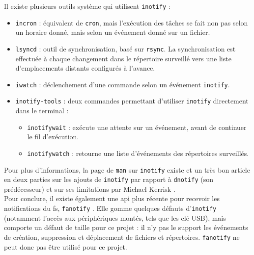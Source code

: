 Il existe plusieurs outils système qui utilisent \texttt{inotify} \cite{ref30} :
\begin{itemize}
    \item \texttt{incron} : équivalent de \texttt{cron}, mais l'exécution 
        des tâches se fait non pas selon un horaire donné, mais selon un événement donné sur un fichier.
    \item \texttt{lsyncd} : outil de synchronisation, basé sur \texttt{rsync}. 
        La synchronisation est effectuée à chaque changement dans le répertoire surveillé vers une 
        liste d'emplacements distants configurés à l'avance.
    \item \texttt{iwatch} : déclenchement d'une commande selon un événement \texttt{inotify}.
    \item \texttt{inotify-tools} : deux commandes permettant d'utiliser \texttt{inotify} 
        directement dans le terminal :
        \begin{itemize}
            \item \texttt{inotifywait} : exécute une attente sur un événement, avant de 
                continuer le fil d'exécution.
            \item \texttt{inotifywatch} : retourne une liste d'événements des répertoires surveillés.
        \end{itemize}
\end{itemize}
Pour plus d'informations, la page de \texttt{man} sur \texttt{inotify} existe \cite{ref29} et 
un très bon article en deux parties sur les ajouts de \texttt{inotify} par rapport à \texttt{dnotify} 
(son prédécesseur) \cite{ref31} et sur ses limitations par Michael Kerrisk \cite{ref32}.
\\
Pour conclure, il existe également une \acrshort{api} plus récente pour recevoir les notifications du 
\acrshort{fs}, \texttt{fanotify} \cite{ref38}. Elle gomme quelques défauts d'\texttt{inotify}
(notamment l'accès aux périphériques montés, tels que les clé USB), mais comporte un défaut de taille 
pour ce projet : il n'y pas le support les événements de création, suppression et déplacement de fichiers 
et répertoires. \texttt{fanotify} ne peut donc pas être utilisé pour ce projet.

